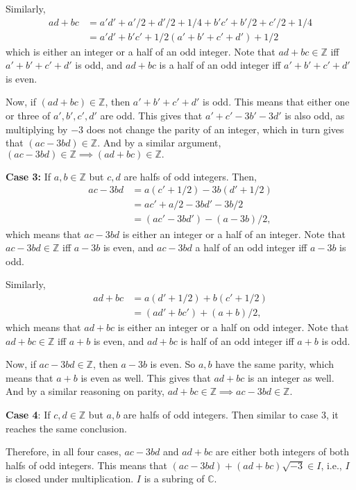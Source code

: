 \documentclass[12pt]{article}
\begin{document}
\begin{fproof}[Jacobson 2.1.4]
  Similarly, 
  \begin{align*}
    ad + bc &= a'd' + a'/2 + d'/2 + 1/4 + b'c' + b'/2 + c'/2 + 1/4 \\
    & = a'd' + b'c' + 1/2(a' + b' + c' + d') + 1/2
  \end{align*}
  which is either an integer or a half of an odd integer.
  Note that \(ad + bc \in \mathbb{Z}\) iff \(a' + b' + c' + d'\) is odd, and \(ad + bc\) is a half of an odd integer iff \(a' + b' + c' + d'\) is even.

  Now, if \((ad+bc) \in \mathbb{Z}\), then \(a'+b'+c'+d'\) is odd. This means that either one or three of \(a',b',c',d'\) are odd. This gives that \(a' + c' -3b'-3d'\) is also odd, as multiplying by \(-3\) does not change the parity of an integer, which in turn gives that \((ac-3bd) \in \mathbb{Z}\). And by a similar argument, \((ac-3bd) \in \mathbb{Z} \implies (ad+bc) \in \mathbb{Z}.\)


  \textbf{Case 3:} If \(a,b \in \mathbb{Z}\) but \(c,d\) are halfs of odd integers.
  Then,
  \begin{align*}
    ac - 3bd & = a(c' + 1/2) -3b(d'+1/2) \\
    & = ac' + a/2 - 3bd' - 3b/2\\
    & = (ac' - 3bd') - (a-3b)/2,
  \end{align*}
  which means that \(ac - 3bd\) is either an integer or a half of an integer.
  Note that \(ac - 3bd \in \mathbb{Z}\) iff \(a-3b\) is even, and \(ac - 3bd\) a half of an odd integer iff \(a-3b\) is odd.

  Similarly, 
  \begin{align*}
    ad+bc &= a(d'+1/2) + b(c'+1/2) \\
    & =  (ad' + bc') + (a+b)/2,
  \end{align*}
  which means that \(ad + bc\) is either an integer or a half on odd integer.
  Note that \(ad + bc \in \mathbb{Z}\) iff \(a+b\) is even, and \(ad + bc\) is half of an odd integer iff \(a+b\) is odd.

  Now, if \(ac-3bd \in \mathbb{Z}\), then \(a-3b\) is even.
  So \(a,b\) have the same parity, which means that \(a+b\) is even as well.
  This gives that \(ad+bc\) is an integer as well.
  And by a similar reasoning on parity, \(ad+bc \in \mathbb{Z} \implies ac-3bd \in \mathbb{Z}\).

  \textbf{Case 4}: If \(c,d \in \mathbb{Z}\) but \(a,b\) are halfs of odd integers. Then similar to case 3, it reaches the same conclusion.

  Therefore, in all four cases, \(ac-3bd\) and \(ad+bc\) are either both integers of both halfs of odd integers. This means that \((ac - 3bd) + (ad + bc) \sqrt{-3} \in I\), i.e., \(I\) is closed under multiplication.
  \(I\) is a subring of \(\mathbb{C}\).
\end{fproof}
\newpage
\end{document}
